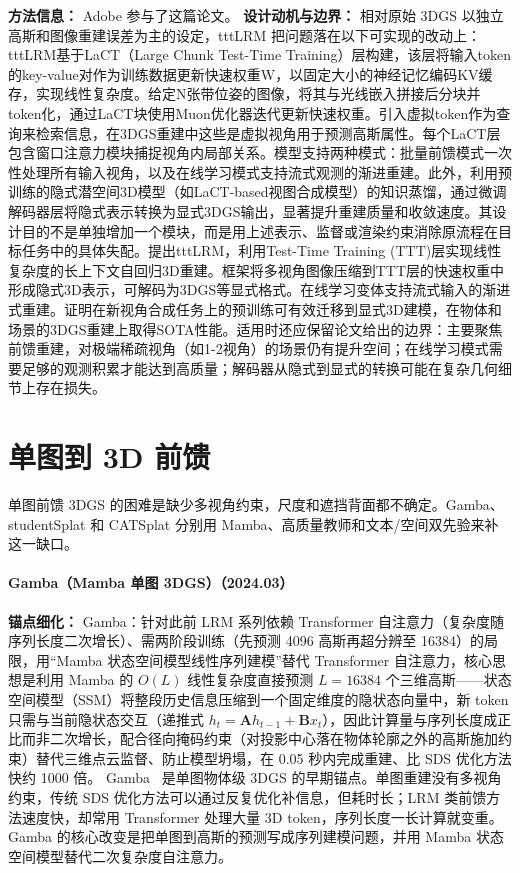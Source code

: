 \textbf{方法信息：} Adobe 参与了这篇论文。
\textbf{设计动机与边界：} 相对原始 3DGS 以独立高斯和图像重建误差为主的设定，tttLRM 把问题落在以下可实现的改动上：tttLRM基于LaCT（Large Chunk Test-Time Training）层构建，该层将输入token的key-value对作为训练数据更新快速权重W，以固定大小的神经记忆编码KV缓存，实现线性复杂度。给定N张带位姿的图像，将其与光线嵌入拼接后分块并token化，通过LaCT块使用Muon优化器迭代更新快速权重。引入虚拟token作为查询来检索信息，在3DGS重建中这些是虚拟视角用于预测高斯属性。每个LaCT层包含窗口注意力模块捕捉视角内局部关系。模型支持两种模式：批量前馈模式一次性处理所有输入视角，以及在线学习模式支持流式观测的渐进重建。此外，利用预训练的隐式潜空间3D模型（如LaCT-based视图合成模型）的知识蒸馏，通过微调解码器层将隐式表示转换为显式3DGS输出，显著提升重建质量和收敛速度。其设计目的不是单独增加一个模块，而是用上述表示、监督或渲染约束消除原流程在目标任务中的具体失配。提出tttLRM，利用Test-Time Training (TTT)层实现线性复杂度的长上下文自回归3D重建。框架将多视角图像压缩到TTT层的快速权重中形成隐式3D表示，可解码为3DGS等显式格式。在线学习变体支持流式输入的渐进式重建。证明在新视角合成任务上的预训练可有效迁移到显式3D建模，在物体和场景的3DGS重建上取得SOTA性能。适用时还应保留论文给出的边界：主要聚焦前馈重建，对极端稀疏视角（如1-2视角）的场景仍有提升空间；在线学习模式需要足够的观测积累才能达到高质量；解码器从隐式到显式的转换可能在复杂几何细节上存在损失。

\section{单图到 3D 前馈}

单图前馈 3DGS 的困难是缺少多视角约束，尺度和遮挡背面都不确定。Gamba、studentSplat 和 CATSplat 分别用 Mamba、高质量教师和文本/空间双先验来补这一缺口。
\paragraph{Gamba（Mamba 单图 3DGS）（2024.03）}
\textbf{锚点细化：} Gamba：针对此前 LRM 系列依赖 Transformer 自注意力（复杂度随序列长度二次增长）、需两阶段训练（先预测 4096 高斯再超分辨至 16384）的局限，用``Mamba 状态空间模型线性序列建模''替代 Transformer 自注意力，核心思想是利用 Mamba 的 $O(L)$ 线性复杂度直接预测 $L{=}16384$ 个三维高斯——状态空间模型（SSM）将整段历史信息压缩到一个固定维度的隐状态向量中，新 token 只需与当前隐状态交互（递推式 $h_t = \mathbf{A}h_{t-1} + \mathbf{B}x_t$），因此计算量与序列长度成正比而非二次增长，配合径向掩码约束（对投影中心落在物体轮廓之外的高斯施加约束）替代三维点云监督、防止模型坍塌，在 0.05 秒内完成重建、比 SDS 优化方法快约 1000 倍。
Gamba~\cite{2403_18795} 是单图物体级 3DGS 的早期锚点。单图重建没有多视角约束，传统 SDS 优化方法可以通过反复优化补信息，但耗时长；LRM 类前馈方法速度快，却常用 Transformer 处理大量 3D token，序列长度一长计算就变重。Gamba 的核心改变是把单图到高斯的预测写成序列建模问题，并用 Mamba 状态空间模型替代二次复杂度自注意力。

